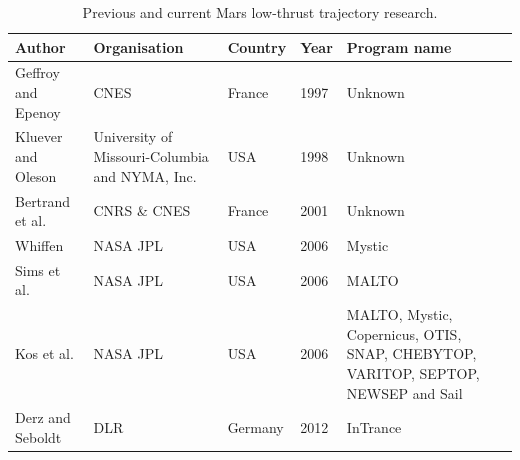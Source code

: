 \begin{table}[!ht]
\begin{center}
\caption{Previous and current Mars low-thrust trajectory research.}
\label{tab:marslow_refres}
\begin{tabular}{|p{3cm}|p{3cm}|l|l|p{3cm}|}
\hline 
\textbf{Author} 	& \textbf{Organisation} & \textbf{Country} & \textbf{Year} & \textbf{Program name} \\ \hline \hline
Geffroy and Epenoy  \cite{geffroy1997optimal} & \acs{CNES} & France & 1997 & Unknown \\ \hline
Kluever and Oleson \cite{kluever1998direct} & University of Missouri-Columbia and NYMA, Inc. & USA & 1998 & Unknown \\ \hline
Bertrand et al. \cite{bertrand2001electric} & \acs{CNRS} \& \acs{CNES} & France & 2001 & Unknown\\ \hline
Whiffen \cite{whiffen2006mystic} & NASA \ac{JPL} & USA & 2006 & Mystic\\ \hline
Sims et al. \cite{sims2006implementation} & NASA \ac{JPL} & USA & 2006 & MALTO \\ \hline
Kos et al.  \cite{kos2006overview} & NASA \ac{JPL} & USA & 2006 & MALTO, Mystic, Copernicus, OTIS, SNAP, CHEBYTOP, VARITOP, SEPTOP, NEWSEP and Sail \\ \hline
Derz and Seboldt \cite{derz2012mars} & \ac{DLR} & Germany & 2012 & InTrance \\ \hline



\end{tabular}
\end{center}
\end{table}

